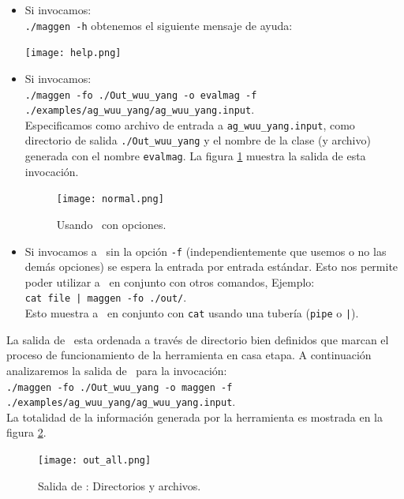 \begin{itemize}
\item Si invocamos:\\ \texttt{./maggen -h} obtenemos el siguiente mensaje de ayuda:
\begin{center}
\texttt{[image: help.png]}
\end{center}
\item Si invocamos: \\ \texttt{./maggen -fo ./Out\_wuu\_yang -o evalmag -f ./examples/ag\_wuu\_yang/ag\_wuu\_yang.input}. \\ Especificamos como archivo de entrada a \texttt{ag\_wuu\_yang.input}, como directorio de salida \texttt{./Out\_wuu\_yang} y el nombre de la clase (y archivo) generada con el nombre \texttt{evalmag}. La figura \ref{fig:outnormal} muestra la salida de esta invocación.
\begin{figure}[h!]\centering
\texttt{[image: normal.png]}
\caption{\label{fig:outnormal} Usando \maggen\ con opciones.}
\end{figure}

\item Si invocamos a \maggen\ sin la opción \texttt{-f} (independientemente que usemos o no las demás opciones) se espera la entrada por entrada estándar. Esto nos permite poder utilizar a \maggen\ en conjunto con otros comandos, Ejemplo:\\ \texttt{cat file | maggen -fo ./out/}.\\ Esto muestra a \maggen\ en conjunto con \texttt{cat} usando una tubería (\texttt{pipe} o \texttt{|}).

\end{itemize}

La salida de \maggen\ esta ordenada a través de directorio bien definidos que marcan el proceso de funcionamiento de la herramienta en casa etapa. A continuación analizaremos la salida de \maggen\ para la invocación:\\

\small\texttt{./maggen -fo ./Out\_wuu\_yang -o maggen -f ./examples/ag\_wuu\_yang/ag\_wuu\_yang.input}.\\

La totalidad de la información generada por la herramienta es mostrada en la figura \ref{fig:outmagegn}.

\begin{figure}[h!]\centering
\texttt{[image: out\_all.png]}
\caption{\label{fig:outmagegn} Salida de \maggen: Directorios y archivos.}
\end{figure}

